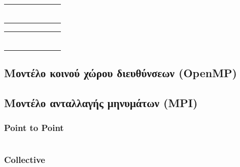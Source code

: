 \documentclass[a4paper,10pt]{article} \usepackage{anysize}
\begin{document}
\begin{minipage}[t]{0.5\textwidth}
        \begin{tabular}{| c | c | c | c | c | c | c |}
            \hline
            \rowcolor{bootblue} & & & & & & \\
            \hline
            \rowcolor{bootgreen} & & & & & & \\
            \hline
            \rowcolor{bootred} & & & & & & \\
            \hline
            \rowcolor{bootblue} & & & & & & \\
            \hline
            \rowcolor{bootgreen} & & & & & & \\
            \hline
            \rowcolor{bootred} & & & & & & \\
            \hline
            \rowcolor{bootblue} & & & & & & \\
            \hline
        \end{tabular}
\end{minipage}
\begin{minipage}[t]{0.5\textwidth}
        \begin{tabular}{| c | c | c | c | c | c | c |}
            \hline
            \rowcolor{bootblue} & & & & & & \\
            \hline
            \rowcolor{bootblue} & & & & & & \\
            \hline
            \rowcolor{bootblue} & & & & & & \\
            \hline
            \rowcolor{bootgreen} & & & & & & \\
            \hline
            \rowcolor{bootgreen} & & & & & & \\
            \hline
            \rowcolor{bootred} & & & & & & \\
            \hline
            \rowcolor{bootred} & & & & & & \\
            \hline
        \end{tabular}
\end{minipage}

\subsection{Μοντέλο κοινού χώρου διευθύνσεων (\textbf{OpenMP})}

\subsection{Μοντέλο ανταλλαγής μηνυμάτων (\textbf{MPI})}

\subsubsection{Point to Point}

\inputminted[linenos,fontsize=\footnotesize,frame=leftline]{c}{files/src-mpi-ptp-hybrid-main.c}

\subsubsection{Collective}

\inputminted[linenos,fontsize=\footnotesize,frame=leftline]{c}{files/src-mpi-collective-hybrid-main.c}
\end{document}
